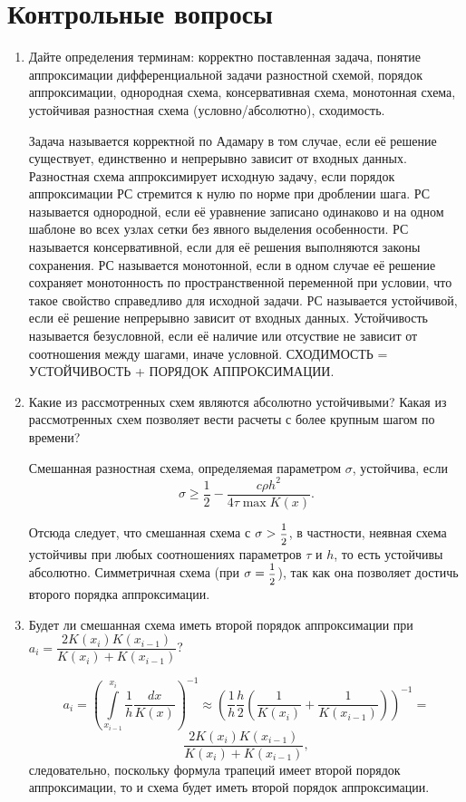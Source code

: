\documentclass[12pt, a4paper]{article}
\begin{document}
\section{Контрольные вопросы}
\begin{enumerate}
\item Дайте определения терминам: корректно поставленная задача, понятие аппроксимации дифференциальной задачи разностной схемой, порядок аппроксимации, однородная схема, консервативная схема, монотонная схема, устойчивая разностная схема (условно/абсолютно), сходимость.

Задача называется корректной по Адамару в том случае, если её решение существует, единственно и непрерывно зависит от входных данных. Разностная схема аппроксимирует исходную задачу, если порядок аппроксимации РС стремится к нулю по норме при дроблении шага. РС называется однородной, если её уравнение записано одинаково и на одном шаблоне во всех узлах сетки без явного выделения особенности. РС называется консервативной, если для её решения выполняются законы сохранения. РС называется монотонной, если в одном случае её решение сохраняет монотонность по пространственной переменной при условии, что такое свойство справедливо для исходной задачи. РС называется устойчивой, если её решение непрерывно зависит от входных данных. Устойчивость называется безусловной, если её наличие или отсуствие не зависит от соотношения между шагами, иначе условной. СХОДИМОСТЬ = УСТОЙЧИВОСТЬ + ПОРЯДОК АППРОКСИМАЦИИ.

\item Какие из рассмотренных схем являются абсолютно устойчивыми? Какая из рассмотренных схем позволяет вести расчеты с более крупным шагом по времени?

Смешанная разностная схема, определяемая параметром $\sigma$, устойчива, если
\[
\sigma \geq \dfrac{1}{2} - \dfrac{c \rho h^2}{4 \tau \max K(x)}.
\]

Отсюда следует, что смешанная схема с $\sigma > \hbox{\footnotesize$\displaystyle\frac{1}{2}$}$, в частности,
неявная схема устойчивы при любых соотношениях параметров $\tau$ и $h$, то есть устойчивы абсолютно. Симметричная схема (при $\sigma = \hbox{\footnotesize$\displaystyle\frac{1}{2}$}$), так как она позволяет достичь второго порядка аппроксимации. 

\item Будет ли смешанная схема иметь второй порядок аппроксимации при $a_i = \dfrac{2 K(x_i)K(x_{i-1})}{K(x_i) + K(x_{i-1})}$?

\[
a_i = \left(\int\limits_{x_{i-1}}^{x_{i}}{\dfrac{1}{h}\dfrac{dx}{K(x)}}\right)^{-1} \approx \left(\dfrac{1}{h}\dfrac{h}{2}\left(\dfrac{1}{K(x_{i})} + \dfrac{1}{K(x_{i-1})}\right)\right)^{-1} = 
\]
\[
\dfrac{2 K(x_i)K(x_{i-1})}{K(x_i) + K(x_{i-1})},
\]
следовательно, поскольку формула трапеций имеет второй порядок аппроксимации, то и схема будет иметь второй порядок аппроксимации. 


\end{enumerate}
\end{document}
